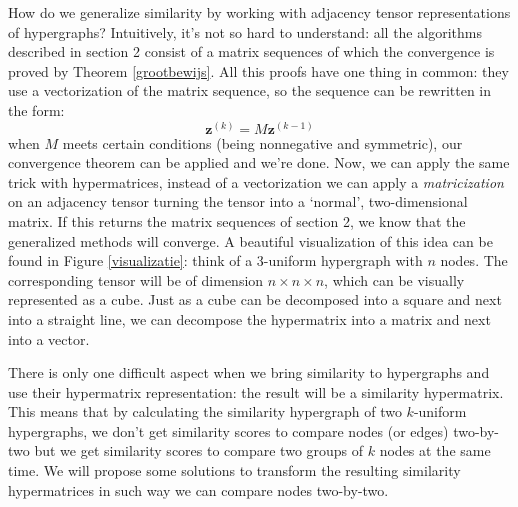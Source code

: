 \documentclass[a4paper,11pt]{report}
\begin{document}
How do we generalize similarity by working with adjacency tensor representations of 
hypergraphs? Intuitively, it's not so hard to understand: all the algorithms 
described in section 2 consist of a matrix sequences of which the convergence is 
proved by Theorem \ref{grootbewijs}. All this proofs have one thing in common: 
they use a vectorization of the matrix sequence, so the sequence can be 
rewritten in the form:
$$\mathbf{z}^{(k)} = M\mathbf{z}^{(k-1)}$$
when $M$ meets certain conditions (being nonnegative and symmetric), our 
convergence theorem can be applied and we're done. Now, we can apply the same 
trick with hypermatrices, instead of a vectorization we can apply a \textit{matricization} on an adjacency tensor
 turning the tensor into a `normal', two-dimensional matrix. If 
this returns the matrix sequences of section 2, we know that the generalized 
methods will converge. A beautiful visualization of this idea can be found in 
Figure \ref{visualizatie}: think of a 3-uniform hypergraph with $n$ nodes. The 
corresponding tensor will be of dimension $n \times n \times n$, which can 
be visually represented as a cube. Just as a cube can be decomposed into a square and next into a straight line, 
we can decompose the hypermatrix into a matrix and next into a vector.

There is only one difficult aspect when we bring similarity to hypergraphs and 
use their hypermatrix representation: the result will be a similarity 
hypermatrix. This means that by calculating the similarity hypergraph of two  $k$-uniform hypergraphs, we don't get similarity scores to compare nodes (or edges) two-by-two
but we get similarity scores to compare two groups of $k$ nodes at the same time. 
We will propose some solutions to transform the resulting similarity hypermatrices 
in such way we can compare nodes two-by-two.
\end{document}
